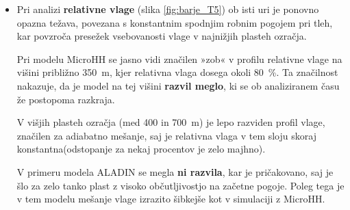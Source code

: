 \documentclass[mat2, tisk]{fmfdelo}
\begin{document}
\begin{itemize}
Oba numerična modela to zgornjo inverzno plast {realistično reproducirata}, 
prav tako je v obeh primerih opazno ustrezno mešanje v spodnjem delu atmosfere. 
Model {ALADIN}\footnote{ALADIN (Aire Limitée Adaptation dynamique Développement InterNational) je regionalni numerični vremenski model, ki ga uporablja tudi ARSO za operativne vremenske napovedi.} 
kaže popolnoma {premešan zrak vse do tal}, medtem ko model 
{MicroHH} ohranja prisotnost \textbf{talne inverzije}. 
Poleg tega se pri modelu MicroHH kaže, da {robni pogoj na tleh} 
po določenem času (nastavljen ob {5:00}) \textbf{ni več ustrezen}, saj ga med napovedjo ni mogoče spreminjati. 

\item Pri analizi \textbf{relativne vlage} (slika \ref{fig:barje_T5}) ob isti uri je ponovno opazna težava, povezana s 
{konstantnim spodnjim robnim pogojem} pri tleh, kar povzroča 
{presežek vsebovanosti vlage v najnižjih plasteh ozračja}. 

Pri modelu {MicroHH} se jasno vidi značilen 
{»zob« v profilu relativne vlage} na višini približno {350~m}, 
kjer relativna vlaga dosega okoli {80~\%}. 
Ta značilnost nakazuje, da je model na tej višini \textbf{razvil meglo}, 
ki se ob analiziranem času že {postopoma razkraja}. 

V višjih plasteh ozračja (med {400 in 700~m}) je lepo razviden 
{profil vlage}, značilen za {adiabatno mešanje}, 
saj je {relativna vlaga v tem sloju skoraj konstantna}(odstopanje za nekaj procentov je zelo majhno). 

V primeru modela {ALADIN} 
se megla \textbf{ni razvila}, kar je pričakovano, saj je šlo za {zelo tanko plast} 
z visoko občutljivostjo na začetne pogoje. 
Poleg tega je v tem modelu {mešanje vlage izrazito šibkejše} kot v simulaciji z MicroHH. 

\end{itemize}
\end{document}
